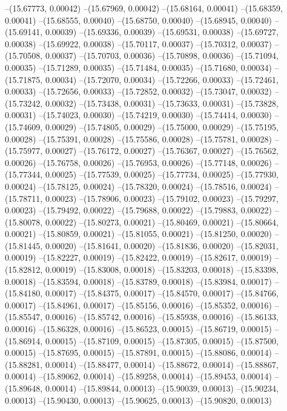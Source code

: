 --(15.67773, 0.00042)
--(15.67969, 0.00042)
--(15.68164, 0.00041)
--(15.68359, 0.00041)
--(15.68555, 0.00040)
--(15.68750, 0.00040)
--(15.68945, 0.00040)
--(15.69141, 0.00039)
--(15.69336, 0.00039)
--(15.69531, 0.00038)
--(15.69727, 0.00038)
--(15.69922, 0.00038)
--(15.70117, 0.00037)
--(15.70312, 0.00037)
--(15.70508, 0.00037)
--(15.70703, 0.00036)
--(15.70898, 0.00036)
--(15.71094, 0.00035)
--(15.71289, 0.00035)
--(15.71484, 0.00035)
--(15.71680, 0.00034)
--(15.71875, 0.00034)
--(15.72070, 0.00034)
--(15.72266, 0.00033)
--(15.72461, 0.00033)
--(15.72656, 0.00033)
--(15.72852, 0.00032)
--(15.73047, 0.00032)
--(15.73242, 0.00032)
--(15.73438, 0.00031)
--(15.73633, 0.00031)
--(15.73828, 0.00031)
--(15.74023, 0.00030)
--(15.74219, 0.00030)
--(15.74414, 0.00030)
--(15.74609, 0.00029)
--(15.74805, 0.00029)
--(15.75000, 0.00029)
--(15.75195, 0.00028)
--(15.75391, 0.00028)
--(15.75586, 0.00028)
--(15.75781, 0.00028)
--(15.75977, 0.00027)
--(15.76172, 0.00027)
--(15.76367, 0.00027)
--(15.76562, 0.00026)
--(15.76758, 0.00026)
--(15.76953, 0.00026)
--(15.77148, 0.00026)
--(15.77344, 0.00025)
--(15.77539, 0.00025)
--(15.77734, 0.00025)
--(15.77930, 0.00024)
--(15.78125, 0.00024)
--(15.78320, 0.00024)
--(15.78516, 0.00024)
--(15.78711, 0.00023)
--(15.78906, 0.00023)
--(15.79102, 0.00023)
--(15.79297, 0.00023)
--(15.79492, 0.00022)
--(15.79688, 0.00022)
--(15.79883, 0.00022)
--(15.80078, 0.00022)
--(15.80273, 0.00021)
--(15.80469, 0.00021)
--(15.80664, 0.00021)
--(15.80859, 0.00021)
--(15.81055, 0.00021)
--(15.81250, 0.00020)
--(15.81445, 0.00020)
--(15.81641, 0.00020)
--(15.81836, 0.00020)
--(15.82031, 0.00019)
--(15.82227, 0.00019)
--(15.82422, 0.00019)
--(15.82617, 0.00019)
--(15.82812, 0.00019)
--(15.83008, 0.00018)
--(15.83203, 0.00018)
--(15.83398, 0.00018)
--(15.83594, 0.00018)
--(15.83789, 0.00018)
--(15.83984, 0.00017)
--(15.84180, 0.00017)
--(15.84375, 0.00017)
--(15.84570, 0.00017)
--(15.84766, 0.00017)
--(15.84961, 0.00017)
--(15.85156, 0.00016)
--(15.85352, 0.00016)
--(15.85547, 0.00016)
--(15.85742, 0.00016)
--(15.85938, 0.00016)
--(15.86133, 0.00016)
--(15.86328, 0.00016)
--(15.86523, 0.00015)
--(15.86719, 0.00015)
--(15.86914, 0.00015)
--(15.87109, 0.00015)
--(15.87305, 0.00015)
--(15.87500, 0.00015)
--(15.87695, 0.00015)
--(15.87891, 0.00015)
--(15.88086, 0.00014)
--(15.88281, 0.00014)
--(15.88477, 0.00014)
--(15.88672, 0.00014)
--(15.88867, 0.00014)
--(15.89062, 0.00014)
--(15.89258, 0.00014)
--(15.89453, 0.00014)
--(15.89648, 0.00014)
--(15.89844, 0.00013)
--(15.90039, 0.00013)
--(15.90234, 0.00013)
--(15.90430, 0.00013)
--(15.90625, 0.00013)
--(15.90820, 0.00013)
